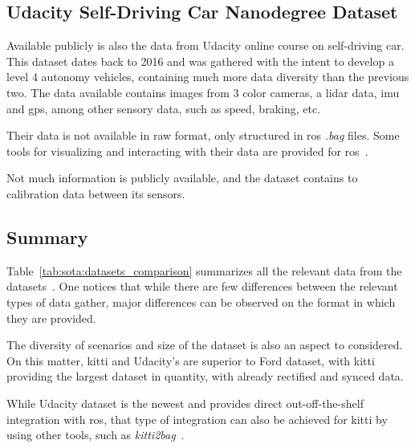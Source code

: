 \subsection{Udacity Self-Driving Car Nanodegree Dataset}
Available publicly is also the data from Udacity online course on self-driving car. This dataset dates back to 2016 and was gathered with the intent to develop a level 4 autonomy vehicles, containing much more data diversity than the previous two. The data available contains images from 3 color cameras, a \ac{lidar} data, \ac{imu} and \ac{gps}, among other sensory data, such as speed, braking, etc.

Their data is not available in raw format, only structured in \ac{ros} \textit{.bag} files. Some tools for visualizing and interacting with their data are provided for \ac{ros}~\cite{udacity}. 

Not much information is publicly available, and the dataset contains to calibration data between its sensors.

\subsection{Summary}
Table~\ref{tab:sota:datasets_comparison} summarizes all the relevant data from the datasets~\cite{udacity, Pandey2011, Geiger2013a}. One notices that while there are few differences between the relevant types of data gather, major differences can be observed on the format in which they are provided. 

The diversity of scenarios and size of the dataset is also an aspect to considered. On this matter, \ac{kitti} and Udacity's are superior to Ford dataset, with \ac{kitti} providing the largest dataset in quantity, with already rectified and synced data. 

While Udacity dataset is the newest and provides direct out-off-the-shelf integration with \ac{ros}, that type of integration can also be achieved for \ac{kitti} by using other tools, such as \textit{kitti2bag}~\cite{TomasKrejci}. 
	
